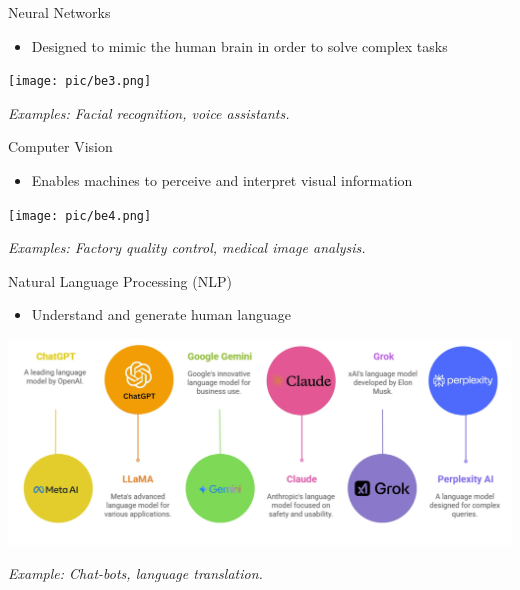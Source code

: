 \documentclass[serif, aspectratio=169]{beamer}
\begin{document}
\begin{frame}{Neural Networks}
    \begin{itemize}
        \item Designed to mimic the human brain in order to solve complex tasks
    \end{itemize}
    \vspace{0.4cm}
    \begin{center}
        \texttt{[image: pic/be3.png]}
    \end{center}
    \vspace{0.3cm}
    \begin{center}
        \textit{Examples: Facial recognition, voice assistants.}
    \end{center}
\end{frame}

\begin{frame}{Computer Vision}
    \begin{itemize}
        \item Enables machines to perceive and interpret visual information
    \end{itemize}
    \begin{center}
        \texttt{[image: pic/be4.png]} 
    \end{center}
    \begin{center}
        \textit{Examples: Factory quality control, medical image analysis.}
    \end{center}
\end{frame}


\begin{frame}{Natural Language Processing (NLP)}
    \begin{itemize}
        \item Understand and generate human language
    \end{itemize}
    \vspace{0.5cm}
    \begin{center}
        \includegraphics[width=0.6\linewidth]{pic/be5.png}
    \end{center}
    \begin{center}
        \textit{Example: Chat-bots, language translation.}
    \end{center}
\end{frame}
\end{document}
